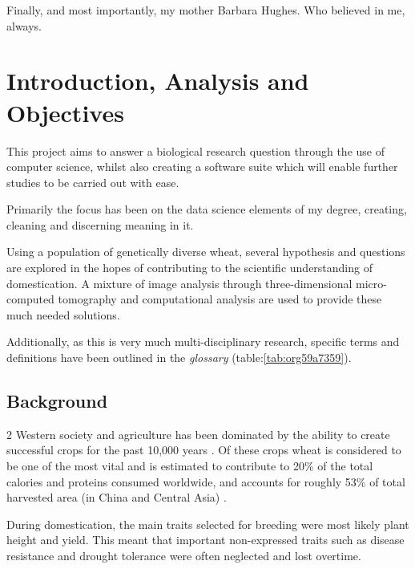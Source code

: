 \documentclass[11pt]{report}
\begin{document}
\vspace{1cm}

Finally, and most importantly, my mother Barbara Hughes. Who believed in me, always.



  \clearpage
  \tableofcontents
  \clearpage
  \listoftables
  \clearpage
  \listoffigures
  \clearpage
  \listofmyequations
  \clearpage
  \listoflistings
  \clearpage

\chapter{Introduction, Analysis and Objectives}
\label{sec:org5a56018}

This project aims to answer a biological research question through the use of computer science, whilst also creating a software suite which will enable further studies to be carried out with ease.

Primarily the focus has been on the data science elements of my degree, creating, cleaning and discerning meaning in it.

Using a population of genetically diverse wheat, several hypothesis and questions are explored in the hopes of contributing to the scientific understanding of domestication. A mixture of image analysis through three-dimensional micro-computed tomography and computational analysis are used to provide these much needed solutions.

Additionally, as this is very much multi-disciplinary research, specific terms and definitions have been outlined in the \emph{glossary} (table:\ref{tab:org59a7359}).

\section{Background}
\label{sec:orga8444a7}
2
   Western society and agriculture has been dominated by the ability to create successful crops for the past 10,000 years \cite{Ozkan2002}. Of these crops wheat is considered to be one of the most vital and is estimated to contribute to 20\% of the total calories and proteins consumed worldwide, and accounts for roughly 53\% of total harvested area (in China and Central Asia) \cite{Shiferaw2013}.

During domestication, the main traits selected for breeding were most likely plant height and yield. This meant that important non-expressed traits such as disease resistance and drought tolerance were often neglected and lost overtime.
\end{document}
